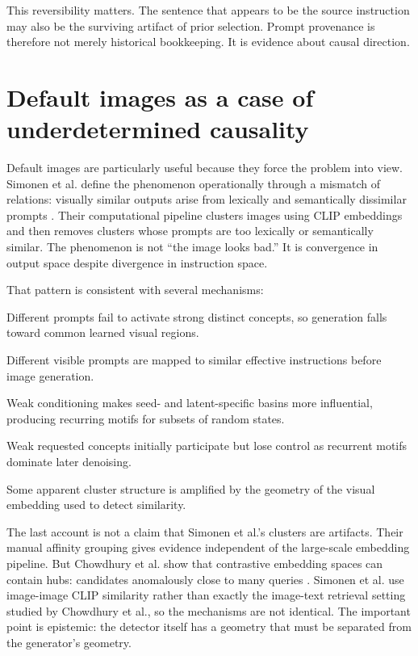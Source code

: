 \documentclass[11pt]{article}
\begin{document}
This reversibility matters. The sentence that appears to be the source instruction may also be the surviving artifact of prior selection. Prompt provenance is therefore not merely historical bookkeeping. It is evidence about causal direction.

\section{Default images as a case of underdetermined causality}

Default images are particularly useful because they force the problem into view. Simonen et al. define the phenomenon operationally through a mismatch of relations: visually similar outputs arise from lexically and semantically dissimilar prompts \citep{Simonen2026DefaultImages}. Their computational pipeline clusters images using CLIP embeddings and then removes clusters whose prompts are too lexically or semantically similar. The phenomenon is not ``the image looks bad.'' It is convergence in output space despite divergence in instruction space.

That pattern is consistent with several mechanisms:

\begin{description}[leftmargin=1.6em,style=nextline]
\item[Weak-representation account.] Different prompts fail to activate strong distinct concepts, so generation falls toward common learned visual regions.
\item[Rewrite-convergence account.] Different visible prompts are mapped to similar effective instructions before image generation.
\item[Sampling-basin account.] Weak conditioning makes seed- and latent-specific basins more influential, producing recurring motifs for subsets of random states.
\item[Temporal-replacement account.] Weak requested concepts initially participate but lose control as recurrent motifs dominate later denoising.
\item[Measurement account.] Some apparent cluster structure is amplified by the geometry of the visual embedding used to detect similarity.
\end{description}

The last account is not a claim that Simonen et al.'s clusters are artifacts. Their manual affinity grouping gives evidence independent of the large-scale embedding pipeline. But Chowdhury et al. show that contrastive embedding spaces can contain hubs: candidates anomalously close to many queries \citep{Chowdhury2024NNN}. Simonen et al. use image-image CLIP similarity rather than exactly the image-text retrieval setting studied by Chowdhury et al., so the mechanisms are not identical. The important point is epistemic: the detector itself has a geometry that must be separated from the generator's geometry.
\end{document}
